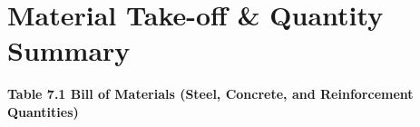 \documentclass[12pt,a4paper]{report}
\numberwithin{table}{chapter}
\numberwithin{figure}{chapter}
\begin{document}
\noindent
\begin{minipage}[t]{0.31\textwidth}
\centering
{}
\label{fig:ed-bracing-sec}
\end{minipage}
\hfill
\begin{minipage}[t]{0.31\textwidth}
\centering
{}
\label{fig:ed-top-chord}
\end{minipage}
\hfill
\begin{minipage}[t]{0.31\textwidth}
\centering
{}
\label{fig:ed-bottom-chord}
\end{minipage}



\chapter{Material Take-off \& Quantity Summary}
\label{ch:material-takeoff}

\noindent\textbf{Table 7.1  Bill of Materials (Steel, Concrete, and Reinforcement Quantities)}
\end{document}

